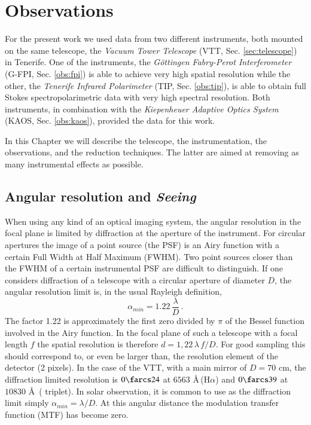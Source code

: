 \chapter{Observations}

For the present work we used data from two different instruments, both mounted on the same telescope, the \emph{ Vacuum Tower Telescope} (VTT, Sec. \ref{sec:telescope}) in Tenerife. One of the instruments, the \emph{G\"ottingen Fabry-Perot Interferometer} (G-FPI, Sec. \ref{obs:fpi}) is able to achieve very high spatial resolution while the other, the \emph{Tenerife Infrared Polarimeter} (TIP, Sec. \ref{obs:tip}), is able to obtain full Stokes spectropolarimetric data with very high spectral resolution. Both instruments, in combination with the \emph{Kiepenheuer Adaptive Optics System} (KAOS, Sec. \ref{obs:kaos}), provided the data for this work.

In this Chapter we will describe the telescope, the instrumentation, the observations, and the reduction techniques. The latter are aimed at removing as many instrumental effects as possible. 

\section{Angular resolution and \emph{Seeing}\label{seeing}}
When using any kind of an optical imaging system, the angular resolution in the focal plane is limited by diffraction at the aperture of the instrument. For circular apertures the image of a point source (the PSF) is an Airy function with a certain Full Width at Half Maximum (FWHM). Two point sources closer than the FWHM of a certain instrumental PSF  are difficult to distinguish. If one considers diffraction of a telescope with a circular aperture of diameter $D$, the angular resolution limit is, in the usual Rayleigh definition,
\begin{equation}
\alpha_{min}=1.22 \, \frac{ \lambda}{D} \, .
\label{ec:res}
\end{equation}
The factor 1.22 is approximately the first zero divided by $\pi$ of the Bessel function involved in the Airy function. In the focal plane of such a telescope with a focal length $f$ the spatial resolution is therefore $d=1,22 \, \lambda\, f/D$. For good sampling this should correspond to, or even be larger than, the resolution element of the detector (2 pixels). In the case of the VTT, with a main mirror of $D=70$ cm, the diffraction limited resolution is $0\farcs24$ at $6563$ \AA\,(H$\alpha$) and $0\farcs39$ at $10830$ \AA\, ( triplet). In solar observation, it is common to use as the diffraction limit simply $\alpha_{min}=\lambda/D$. At this angular distance the modulation transfer function (MTF) has become zero.

